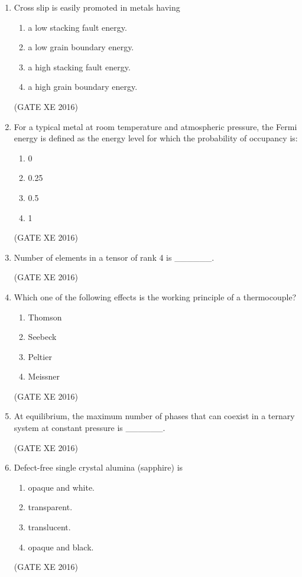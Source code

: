 \documentclass[12pt]{article}
\begin{document}
\begin{enumerate}
\item Cross slip is easily promoted in metals having
\begin{multicols}{2}
\begin{enumerate}
  \item a low stacking fault energy.
  \item a low grain boundary energy.
  \item a high stacking fault energy.
  \item a high grain boundary energy.
\end{enumerate}
\end{multicols}
(GATE XE 2016)

\item For a typical metal at room temperature and atmospheric pressure, the Fermi energy is defined as the energy level for which the probability of occupancy is:
\begin{multicols}{4}
\begin{enumerate}
  \item 0
  \item 0.25
  \item 0.5
  \item 1
\end{enumerate}
\end{multicols}
(GATE XE 2016)

\item Number of elements in a tensor of rank 4 is \_\_\_\_\_\_.

(GATE XE 2016)

\item Which one of the following effects is the working principle of a thermocouple?
\begin{multicols}{4}
\begin{enumerate}
  \item Thomson
  \item Seebeck
  \item Peltier
  \item Meissner
\end{enumerate}
\end{multicols}
(GATE XE 2016)

\item At equilibrium, the maximum number of phases that can coexist in a ternary system at constant pressure is \_\_\_\_\_\_.

(GATE XE 2016)

\item Defect-free single crystal alumina (sapphire) is
\begin{multicols}{2}
\begin{enumerate}
  \item opaque and white.
  \item transparent.
  \item translucent.
  \item opaque and black.
\end{enumerate}
\end{multicols}
(GATE XE 2016)


\end{enumerate}
\end{document}
